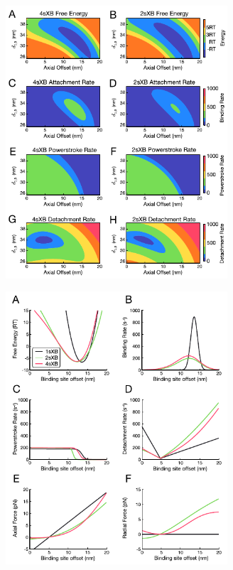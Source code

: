 \documentclass[11pt,titlepage]{article}
\begin{document}
\clearpage
\begin{figure}[ht]
    \begin{center}
    \includegraphics[width=3.25in]{../imgs/Figure2.pdf}
    \caption{
        \label{fig_kinetics_contours}
        }
    \end{center}
\end{figure}

\clearpage
\begin{figure}[ht]
    \begin{center}
    \includegraphics[width=3.25in]{../imgs/Figure3.pdf}
    \caption{
        \label{fig_kinetics_cuts}
        }
    \end{center}
\end{figure}
\end{document}
